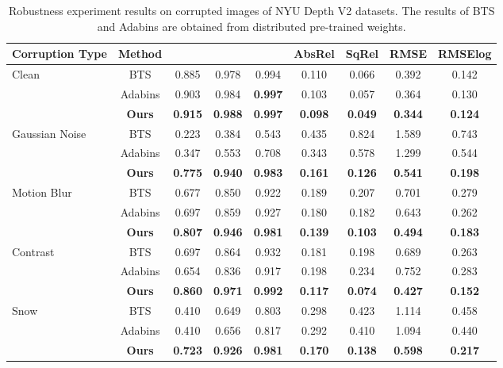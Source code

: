 \documentclass{article}
\begin{document}
\begin{table*}[h]
\centering
\begin{tabular}{l | c | ccccccc}
\toprule
Corruption Type & Method &  &  &  & AbsRel  & SqRel  & RMSE  & RMSElog  \\ \midrule
\multirow{3}{*}{Clean} & BTS & 0.885 & 0.978 & 0.994 & 0.110  & 0.066 & 0.392 & 0.142 \\
                       & Adabins & 0.903 & 0.984 & \textbf{0.997} & 0.103 & 0.057 & 0.364 & 0.130  \\
& \textbf{Ours} & \textbf{0.915} & \textbf{0.988} & \textbf{0.997} & \textbf{0.098}  & \textbf{0.049} & \textbf{0.344} & \textbf{0.124} \\ \midrule
\multirow{3}{*}{Gaussian Noise} & BTS & 0.223 & 0.384 & 0.543 & 0.435 & 0.824 & 1.589 & 0.743 \\
                                & Adabins & 0.347 & 0.553 & 0.708 & 0.343 & 0.578 & 1.299 & 0.544 \\
& \textbf{Ours} & \textbf{0.775} & \textbf{0.940} & \textbf{0.983} & \textbf{0.161}  & \textbf{0.126} & \textbf{0.541} & \textbf{0.198} \\ \midrule
\multirow{3}{*}{Motion Blur} & BTS & 0.677 & 0.850 & 0.922 & 0.189  & 0.207 & 0.701 & 0.279 \\
                             & Adabins & 0.697 & 0.859 & 0.927 & 0.180 & 0.182 & 0.643 & 0.262 \\
& \textbf{Ours} & \textbf{0.807} & \textbf{0.946} & \textbf{0.981} & \textbf{0.139}  & \textbf{0.103} & \textbf{0.494} & \textbf{0.183} \\ \midrule
\multirow{3}{*}{Contrast} & BTS & 0.697 & 0.864 & 0.932 & 0.181  & 0.198 & 0.689 & 0.263 \\
                          & Adabins & 0.654 & 0.836 & 0.917 & 0.198  & 0.234 & 0.752 & 0.283 \\
& \textbf{Ours} & \textbf{0.860} & \textbf{0.971} & \textbf{0.992} & \textbf{0.117}  & \textbf{0.074} & \textbf{0.427} & \textbf{0.152} \\ \midrule
\multirow{3}{*}{Snow} & BTS & 0.410 & 0.649 & 0.803 & 0.298 & 0.423 & 1.114 & 0.458 \\
                      & Adabins & 0.410 & 0.656 & 0.817 & 0.292 & 0.410 & 1.094 & 0.440 \\
& \textbf{Ours} & \textbf{0.723} & \textbf{0.926} & \textbf{0.981} & \textbf{0.170} & \textbf{0.138} & \textbf{0.598} & \textbf{0.217} \\ \midrule
\end{tabular}

\vspace{-3mm}
\caption{Robustness experiment results on corrupted images of NYU Depth V2 datasets. The results of BTS and Adabins are obtained from distributed pre-trained weights.}
\label{tab:robustness_new}
\end{table*}
\end{document}
